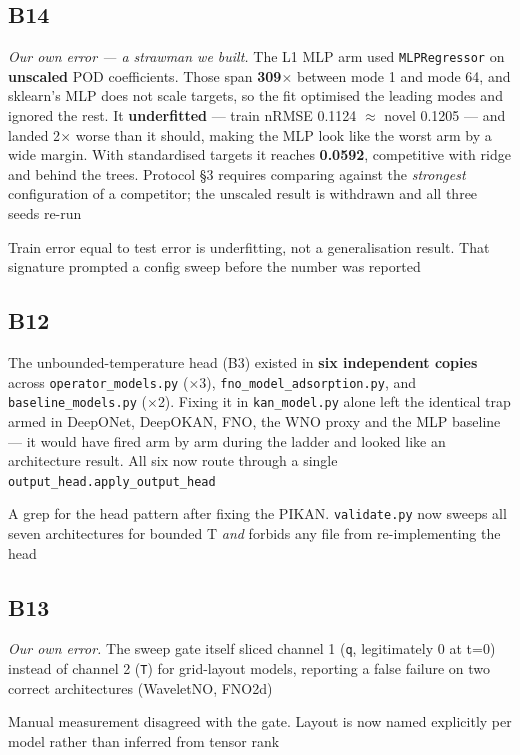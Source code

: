 \documentclass[10pt]{article}
\begin{document}
\subsection*{B14}\label{led:B14}
\begin{description}[leftmargin=0pt,itemsep=1pt]
\item[Defect.] \emph{Our own error --- a strawman we built.} The L1 MLP arm used \texttt{MLPRegressor} on \textbf{unscaled} POD coefficients. Those span \textbf{309$\times$} between mode 1 and mode 64, and sklearn's MLP does not scale targets, so the fit optimised the leading modes and ignored the rest. It \textbf{underfitted} --- train nRMSE 0.1124 $\approx$ novel 0.1205 --- and landed 2$\times$ worse than it should, making the MLP look like the worst arm by a wide margin. With standardised targets it reaches \textbf{0.0592}, competitive with ridge and behind the trees. Protocol §3 requires comparing against the \emph{strongest} configuration of a competitor; the unscaled result is withdrawn and all three seeds re-run
\item[How it was caught.] Train error equal to test error is underfitting, not a generalisation result. That signature prompted a config sweep before the number was reported
\end{description}
\subsection*{B12}\label{led:B12}
\begin{description}[leftmargin=0pt,itemsep=1pt]
\item[Defect.] The unbounded-temperature head (B3) existed in \textbf{six independent copies} across \texttt{operator\_models.py} ($\times$3), \texttt{fno\_model\_adsorption.py}, and \texttt{baseline\_models.py} ($\times$2). Fixing it in \texttt{kan\_model.py} alone left the identical trap armed in DeepONet, DeepOKAN, FNO, the WNO proxy and the MLP baseline --- it would have fired arm by arm during the ladder and looked like an architecture result. All six now route through a single \texttt{output\_head.apply\_output\_head}
\item[How it was caught.] A grep for the head pattern after fixing the PIKAN. \texttt{validate.py} now sweeps all seven architectures for bounded T \emph{and} forbids any file from re-implementing the head
\end{description}
\subsection*{B13}\label{led:B13}
\begin{description}[leftmargin=0pt,itemsep=1pt]
\item[Defect.] \emph{Our own error.} The sweep gate itself sliced channel 1 (\texttt{q}, legitimately 0 at t=0) instead of channel 2 (\texttt{T}) for grid-layout models, reporting a false failure on two correct architectures (WaveletNO, FNO2d)
\item[How it was caught.] Manual measurement disagreed with the gate. Layout is now named explicitly per model rather than inferred from tensor rank
\end{description}
\end{document}
